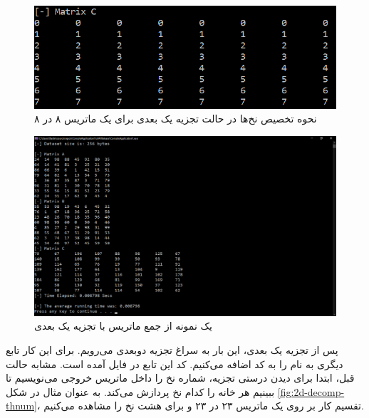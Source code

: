 \documentclass{HW}
\begin{document}
\begin{figure}[ht!]
\begin{center}
	\includegraphics[width=12cm]{images/1d-decomp-thnum}
\end{center}
\caption{نحوه تخصیص نخ‌ها در حالت تجزیه یک بعدی برای یک ماتریس ۸ در ۸}
\label{fig:1d-decomp-thnum}
\end{figure}

\begin{figure}[ht!]
\begin{center}
	\includegraphics[width=15cm]{images/1d-decomp-add}
\end{center}
\caption{یک نمونه از جمع ماتریس با تجزیه یک بعدی}
\label{fig:1d-decomp-add}
\end{figure}

پس از تجزیه یک بعدی، این بار به سراغ تجزیه دوبعدی می‌رویم. برای این کار تابع دیگری به نام  را به کد اضافه می‌کنیم. کد این تابع در فایل
آمده است. مشابه حالت قبل، ابتدا برای دیدن درستی تجزیه، شماره نخ را داخل ماتریس خروجی می‌نویسیم تا ببینیم هر خانه را کدام نخ پردازش می‌کند. به عنوان مثال در شکل
\ref{fig:2d-decomp-thnum}،
تقسیم کار بر روی یک ماتریس ۲۳ در ۲۳ و برای هشت نخ را مشاهده می‌کنیم.
\end{document}
